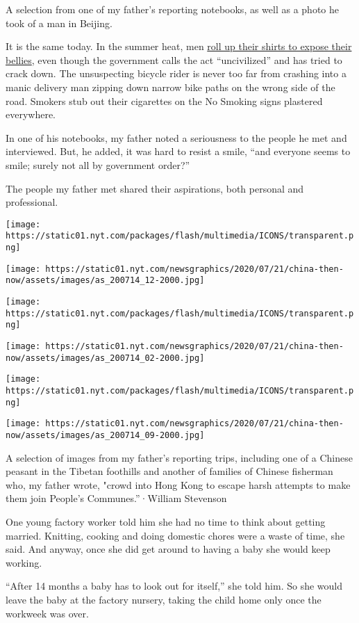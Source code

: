A selection from one of my father's reporting notebooks, as well as a
photo he took of a man in Beijing.

It is the same today. In the summer heat, men
\href{https://www.nytimes.com/2016/09/02/world/what-in-the-world/china-summer-beijing-bikini.html}{roll
up their shirts to expose their bellies}, even though the government
calls the act ``uncivilized'' and has tried to crack down. The
unsuspecting bicycle rider is never too far from crashing into a manic
delivery man zipping down narrow bike paths on the wrong side of the
road. Smokers stub out their cigarettes on the No Smoking signs
plastered everywhere.

In one of his notebooks, my father noted a seriousness to the people he
met and interviewed. But, he added, it was hard to resist a smile, ``and
everyone seems to smile; surely not all by government order?''

The people my father met shared their aspirations, both personal and
professional.

\texttt{[image: https://static01.nyt.com/packages/flash/multimedia/ICONS/transparent.png]}

\texttt{[image: https://static01.nyt.com/newsgraphics/2020/07/21/china-then-now/assets/images/as\_200714\_12-2000.jpg]}

\texttt{[image: https://static01.nyt.com/packages/flash/multimedia/ICONS/transparent.png]}

\texttt{[image: https://static01.nyt.com/newsgraphics/2020/07/21/china-then-now/assets/images/as\_200714\_02-2000.jpg]}

\texttt{[image: https://static01.nyt.com/packages/flash/multimedia/ICONS/transparent.png]}

\texttt{[image: https://static01.nyt.com/newsgraphics/2020/07/21/china-then-now/assets/images/as\_200714\_09-2000.jpg]}

A selection of images from my father's reporting trips, including one of
a Chinese peasant in the Tibetan foothills and another of families of
Chinese fisherman who, my father wrote, "crowd into Hong Kong to escape
harsh attempts to make them join People's Communes.''·William Stevenson

One young factory worker told him she had no time to think about getting
married. Knitting, cooking and doing domestic chores were a waste of
time, she said. And anyway, once she did get around to having a baby she
would keep working.

``After 14 months a baby has to look out for itself,'' she told him. So
she would leave the baby at the factory nursery, taking the child home
only once the workweek was over.

